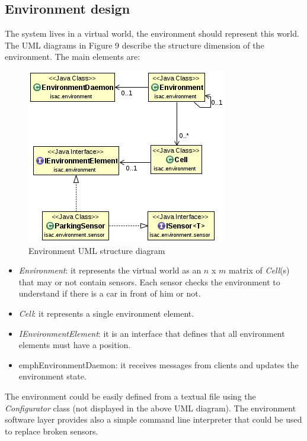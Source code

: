 \documentclass[11pt]{article}
\begin{document}
\subsection{Environment design}
The system lives in a virtual world, the environment should represent this world. The UML diagrams in Figure 9 describe the structure dimension of the environment. The main elements are:
\begin{figure}
  \centering
	\includegraphics[scale=0.8]{environmentUML}
  \caption{Environment UML structure diagram}
\end{figure}
\begin{itemize}
\item \emph{Environment}: it represents the virtual world as an $n$ x $m$ matrix of \emph{Cell}(s) that may or not contain sensors. Each sensor checks the environment to understand if there is a car in front of him or not.
\item \emph{Cell}: it represents a single environment element. 
\item \emph{IEnvironmentElement}: it is an interface that defines that all environment elements must have a position.
\item emph{EnvironmentDaemon}: it receives messages from clients and updates the environment state.
\end{itemize}
The environment could be easily defined from a textual file using the \emph{Configurator} class (not displayed in the above UML diagram). The environment software layer provides also a simple command line interpreter that could be used to replace broken sensors.
\end{document}
